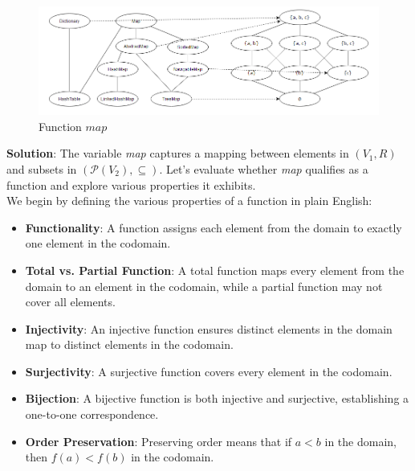 \documentclass[12pt]{article}
\begin{document}
\begin{spacing}{1.5}
    \begin{figure}[htp]
        \centering
        \includegraphics[width=1.1\textwidth]{FunctionMapping_6_3.png}
        \caption{Function $map$}
        \label{fig:figure}
    \end{figure}

    \noindent \textbf{Solution}: The variable \textit{map} captures a mapping between elements in $(V_1, R)$ and subsets in $(\mathcal{P}(V_2), \subseteq)$. Let's evaluate whether \textit{map} qualifies as a function and explore various properties it exhibits.\\

    \noindent We begin by defining the various properties of a function in plain English:

    \begin{itemize}
        \item \textbf{Functionality}: A function assigns each element from the domain to exactly one element in the codomain.
        
        \item \textbf{Total vs. Partial Function}: A total function maps every element from the domain to an element in the codomain, while a partial function may not cover all elements.
    
        \item \textbf{Injectivity}: An injective function ensures distinct elements in the domain map to distinct elements in the codomain.
    
        \item \textbf{Surjectivity}: A surjective function covers every element in the codomain.
    
        \item \textbf{Bijection}: A bijective function is both injective and surjective, establishing a one-to-one correspondence.
    
        \item \textbf{Order Preservation}: Preserving order means that if $a < b$ in the domain, then $f(a) < f(b)$ in the codomain.
    

\end{itemize}
\end{spacing}
\end{document}
